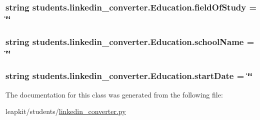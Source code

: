 \hypertarget{classstudents_1_1linkedin__converter_1_1_education_ac1ea0d7760168e3bcf6a22cbc77b3009}{
\subsubsection[{field\-Of\-Study}]{\setlength{\rightskip}{0pt plus 5cm}string students.\-linkedin\-\_\-converter.\-Education.\-field\-Of\-Study = \char`\"{}\char`\"{}\hspace{0.3cm}{\ttfamily [static]}}}\label{classstudents_1_1linkedin__converter_1_1_education_ac1ea0d7760168e3bcf6a22cbc77b3009}
\hypertarget{classstudents_1_1linkedin__converter_1_1_education_afbce23ee5c2c52b61bfa11c8939b4765}{
\subsubsection[{school\-Name}]{\setlength{\rightskip}{0pt plus 5cm}string students.\-linkedin\-\_\-converter.\-Education.\-school\-Name = \char`\"{}\char`\"{}\hspace{0.3cm}{\ttfamily [static]}}}\label{classstudents_1_1linkedin__converter_1_1_education_afbce23ee5c2c52b61bfa11c8939b4765}
\hypertarget{classstudents_1_1linkedin__converter_1_1_education_ac9f024efe815cfcd3909023f5104a21c}{
\subsubsection[{start\-Date}]{\setlength{\rightskip}{0pt plus 5cm}string students.\-linkedin\-\_\-converter.\-Education.\-start\-Date = \char`\"{}\char`\"{}\hspace{0.3cm}{\ttfamily [static]}}}\label{classstudents_1_1linkedin__converter_1_1_education_ac9f024efe815cfcd3909023f5104a21c}


The documentation for this class was generated from the following file\-:\begin{DoxyCompactItemize}
\item 
leapkit/students/\hyperlink{linkedin__converter_8py}{linkedin\-\_\-converter.\-py}\end{DoxyCompactItemize}
